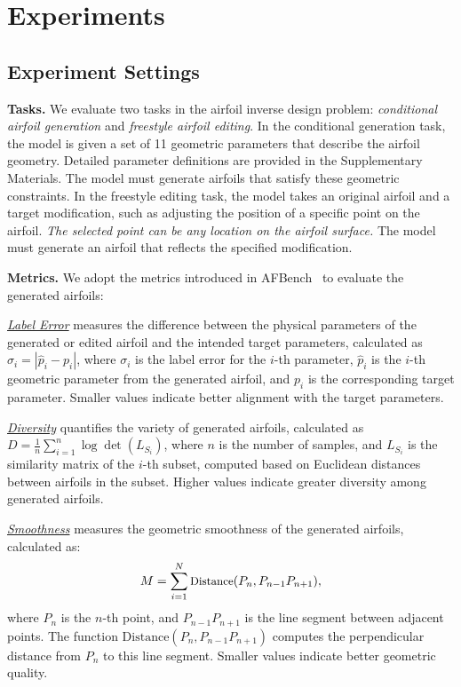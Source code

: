 \section{Experiments}
\subsection{Experiment Settings}

\noindent\textbf{Tasks.}
We evaluate two tasks in the airfoil inverse design problem: \textit{conditional airfoil generation} and \textit{freestyle airfoil editing}.
In the conditional generation task, the model is given a set of 11 geometric parameters that describe the airfoil geometry. Detailed parameter definitions are provided in the Supplementary Materials. The model must generate airfoils that satisfy these geometric constraints.
In the freestyle editing task, the model takes an original airfoil and a target modification, such as adjusting the position of a specific point on the airfoil. \emph{The selected point can be any location on the airfoil surface.} The model must generate an airfoil that reflects the specified modification.

\noindent\textbf{Metrics.} We adopt the metrics introduced in AFBench~\cite{liu2024afbench} to evaluate the generated airfoils:

\underline{\textit{Label Error}} measures the difference between the physical parameters of the generated or edited airfoil and the intended target parameters, calculated as $\sigma_i = \left| \hat{p}_i - p_i \right|$,
where $\sigma_i$ is the label error for the $i$-th parameter, $\hat{p}_i$ is the $i$-th geometric parameter from the generated airfoil, and $p_i$ is the corresponding target parameter. Smaller values indicate better alignment with the target parameters.

\underline{\textit{Diversity}} quantifies the variety of generated airfoils, calculated as $D = \frac{1}{n} \sum_{i=1}^{n} \log \det(L_{S_i})$,
where $n$ is the number of samples, and $L_{S_i}$ is the similarity matrix of the $i$-th subset, computed based on Euclidean distances between airfoils in the subset. Higher values indicate greater diversity among generated airfoils.

\underline{\textit{Smoothness}} measures the geometric smoothness of the generated airfoils, calculated as:
\begin{equation} \small
    M = \sum_{i=1}^{N} \text{Distance}(P_n, P_{n-1} P_{n+1}),
\end{equation}
where $P_n$ is the $n$-th point, and $P_{n-1} P_{n+1}$ is the line segment between adjacent points. The function $\text{Distance}(P_n, P_{n-1} P_{n+1})$ computes the perpendicular distance from $P_n$ to this line segment. Smaller values indicate better geometric quality.

